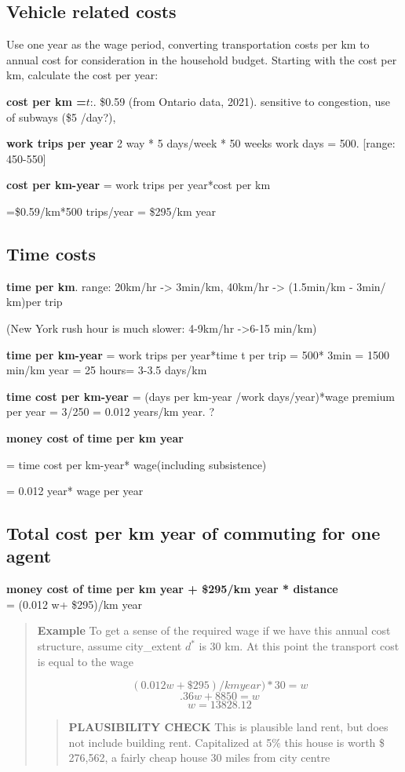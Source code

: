 \subsection{Vehicle related costs}
Use one year as the wage period, converting transportation costs per km to annual cost for consideration in the household budget. Starting with the cost per km, calculate the cost per year:

\textbf{cost per km =$\textit{t}$}:. \$0.59   (from  Ontario data, 2021). sensitive to congestion, use of subways (\$5 /day?), 

 \textbf{work trips per year} 2 way * 5 days/week * 50 weeks work days = 500. [range: 450-550]

\textbf{cost per km-year} = work trips per year*cost per km

=\$0.59/km*500 trips/year  =  \$295/km year 

\subsection{Time costs}
\textbf{time per km}. range: 20km/hr -> 3min/km, 40km/hr -> (1.5min/km - 3min/ km)per trip 

(New York rush hour is much slower:  4-9km/hr ->6-15 min/km)

\textbf{time  per km-year} = work trips per year*time t per trip = 500* 3min  = 1500 min/km year = 25 hours= 3-3.5 days/km
 
\textbf{time cost per km-year} =  (days per km-year /work days/year)*wage premium per year  = 3/250 = 0.012 years/km year. ?

\textbf{money cost of time per km year} 

= time cost per km-year* wage(including subsistence) 

= 0.012 year* wage per year

\subsection{Total cost per km year of commuting for one agent}
\textbf{money cost of time per km year + \$295/km year * distance} \\
= (0.012 w+ \$295)/km year 
    \begin{quotation}
    \textbf{Example}
    To get a sense of the required wage if we have this annual cost structure, assume city\_extent $d^*$ is 30 km. At this point the transport cost is equal to the wage

\[(0.012 w+ \$295)/km year)*30 =  w\] 
\[.36w+ 8850=w\]
\[w=13828.12\]
\begin{quotation}
\textbf{PLAUSIBILITY CHECK}
This is plausible land rent, but does not include building rent. 
Capitalized at 5\% this house is worth \$ 276,562, a fairly cheap house 30 miles from city centre
\end{quotation}
\end{quotation}



